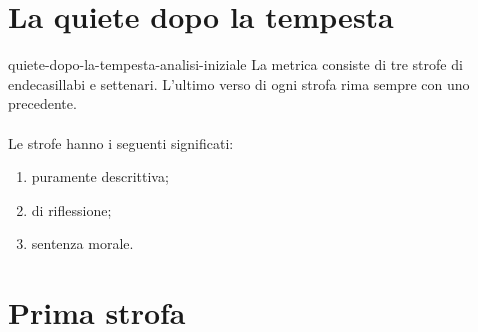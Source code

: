\documentclass[preview]{standalone}
\begin{document}
\genpage

\section{La quiete dopo la tempesta}


\begin{snippet}{quiete-dopo-la-tempesta-analisi-iniziale}
    La metrica consiste di tre strofe di endecasillabi e settenari.
    L'ultimo verso di ogni strofa rima sempre con uno precedente.
    \\\\
    Le strofe hanno i seguenti significati:
    \begin{enumerate}
        \item puramente descrittiva;
        \item di riflessione;
        \item sentenza morale.
    \end{enumerate}
\end{snippet}

\section{Prima strofa}
\end{document}
